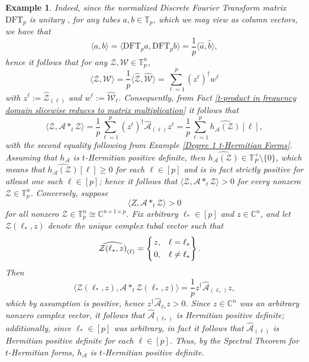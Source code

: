 \documentclass[11pt]{article}
\newtheorem{example}[theorem]{Example}
\begin{document}
\begin{example}
    Indeed, since the normalized Discrete Fourier Transform matrix $\mathrm{DFT}_p$ is unitary \cite{landsberg2024quantum}, for any tubes $a,b\in \mathbb{T}_p$, which we may view as column vectors, we have that 
    \[\langle a,b\rangle = \langle \mathrm{DFT}_pa,\mathrm{DFT}_pb\rangle = \frac{1}{p}\langle \widehat{a},\widehat{b}\rangle,\]
    hence it follows that for any $\mathcal{Z},\mathcal{W}\in \mathbb{T}_p^n$, 
    \[\langle \mathcal{Z},\mathcal{W}\rangle = \frac{1}{p}\langle \widehat{\mathcal{Z}},\widehat{\mathcal{W}}\rangle = \sum\limits_{\ell=1}^p(z^{\ell})^{\dagger}w^{\ell}\]
    with $z^{\ell} := \widehat{\mathcal{Z}}_{(\ell)}$ and $w^{\ell} := \widehat{\mathcal{W}}_{\ell}$. Consequently, from Fact \ref{t-product in frequency domain slicewise reduces to matrix multiplication} it follows that 
    \[\langle \mathcal{Z},\mathcal{A}*_t\mathcal{Z}\rangle = \frac{1}{p}\sum\limits_{\ell=1}^p(z^{\ell})^{\dagger}\widehat{\mathcal{A}}_{(\ell)}z^{\ell} = \frac{1}{p}\sum\limits_{\ell=1}^p\widehat{h_{\mathcal{A}}(\mathcal{Z})}[\ell],\]
    with the second equality following from Example \ref{Degree 1 t-Hermitian Forms}. Assuming that $h_{\mathcal{A}}$ is $t$-Hermitian positive definite, then $\widehat{h_{\mathcal{A}}(\mathcal{Z})}\in \mathbb{T}_P^+\setminus \{0\}$, which means that $\widehat{h_{\mathcal{A}}(\mathcal{Z})}[\ell]\geq 0$ for each $\ell\in [p]$ and is in fact strictly positive for atleast one such $\ell\in [p]$; hence it follows that $\langle \mathcal{Z},\mathcal{A}*_t\mathcal{Z}\rangle > 0$ for every nonzero $\mathcal{Z}\in \mathbb{T}_p^n$. Conversely, suppose 
    \[\langle Z,\mathcal{A}*_t\mathcal{Z}\rangle > 0\]
    for all nonzero $\mathcal{Z}\in \mathbb{T}_p^n\cong \mathbb{C}^{n\times 1\times p}$. Fix arbitrary $\ell_*\in [p]$ and $z\in \mathbb{C}^n$, and let $\mathcal{Z}(\ell_*,z)$ denote the unique complex tubal vector such that 
    \[\widehat{\mathcal{Z}(\ell_*,z)}_{(\ell)} = \begin{cases}
        \begin{rcases}
            z, & \ell = \ell_* \\
            0, & \ell\neq \ell_*
        \end{rcases}.
    \end{cases}\]
    Then 
    \[\langle \mathcal{Z}(\ell_*,z),\mathcal{A}*_t\mathcal{Z}(\ell_*,z)\rangle = \frac{1}{p}z^{\dagger}\widehat{\mathcal{A}}_{(\ell_*)}z,\]
    which by assumption is positive, hence $z^{\dagger}\widehat{\mathcal{A}}_{\ell_*}z > 0$. Since $z\in \mathbb{C}^n$ was an arbitrary nonzero complex vector, it follows that $\widehat{\mathcal{A}}_{(\ell_*)}$ is Hermitian positive definite; additionally, since $\ell_*\in [p]$ was arbitrary, in fact it follows that $\widehat{\mathcal{A}}_{(\ell)}$ is Hermitian positive definite for each $\ell\in [p]$. Thus, by the Spectral Theorem for $t$-Hermitian forms, $h_{\mathcal{A}}$ is $t$-Hermitian positive definite. 
\end{example}
\end{document}
